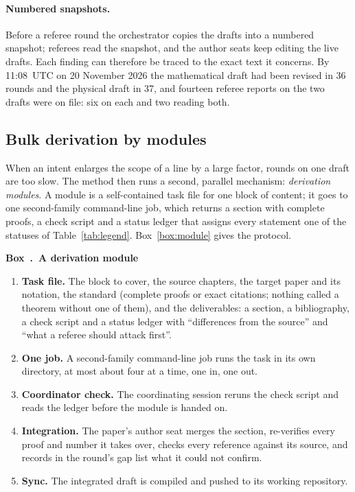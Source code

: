 \documentclass[11pt]{article}
\newcounter{protocolbox}
\newenvironment{protocol}[1]{\refstepcounter{protocolbox}\begin{framed}\noindent\textbf{Box~\theprotocolbox.\ #1}\par\small}{\end{framed}}
\begin{document}
\paragraph{Numbered snapshots.} Before a referee round the orchestrator copies
the drafts into a numbered snapshot; referees read the snapshot, and the
author seats keep editing the live drafts. Each finding can therefore be
traced to the exact text it concerns. By 11:08~UTC on 20 November 2026 the
mathematical draft had been revised in 36 rounds and the physical draft in
37, and fourteen referee reports on the two drafts were on file: six on each
and two reading both.

\subsection{Bulk derivation by modules}
\label{sec:modules}
When an intent enlarges the scope of a line by a large factor, rounds on one
draft are too slow. The method then runs a second, parallel mechanism:
\emph{derivation modules}. A module is a self-contained task file for one
block of content; it goes to one second-family command-line job, which
returns a section with complete proofs, a check script and a status ledger
that assigns every statement one of the statuses of Table~\ref{tab:legend}.
Box~\ref{box:module} gives the protocol.

\begin{protocol}{A derivation module}
\label{box:module}
\begin{enumerate}[leftmargin=*,itemsep=1pt]
\item \textbf{Task file.} The block to cover, the source chapters, the target
paper and its notation, the standard (complete proofs or exact citations;
nothing called a theorem without one of them), and the deliverables: a
section, a bibliography, a check script and a status ledger with
``differences from the source'' and ``what a referee should attack first''.
\item \textbf{One job.} A second-family command-line job runs the task in its
own directory, at most about four at a time, one in, one out.
\item \textbf{Coordinator check.} The coordinating session reruns the check
script and reads the ledger before the module is handed on.
\item \textbf{Integration.} The paper's author seat merges the section,
re-verifies every proof and number it takes over, checks every reference
against its source, and records in the round's gap list what it could not
confirm.
\item \textbf{Sync.} The integrated draft is compiled and pushed to its
working repository.
\end{enumerate}
\end{protocol}
\end{document}
